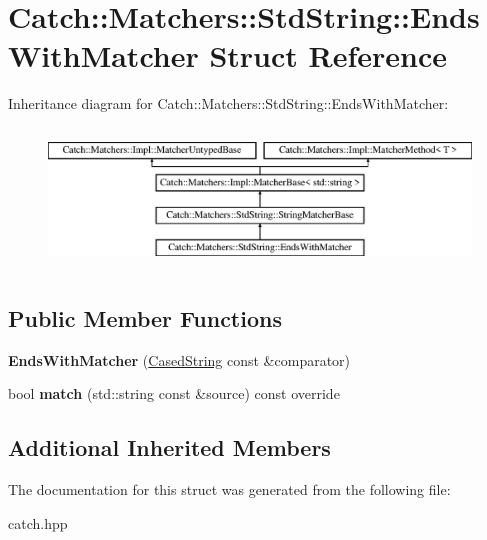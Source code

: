 \hypertarget{structCatch_1_1Matchers_1_1StdString_1_1EndsWithMatcher}{}\section{Catch\+::Matchers\+::Std\+String\+::Ends\+With\+Matcher Struct Reference}
\label{structCatch_1_1Matchers_1_1StdString_1_1EndsWithMatcher}
Inheritance diagram for Catch\+::Matchers\+::Std\+String\+::Ends\+With\+Matcher\+:\begin{figure}[H]
\begin{center}
\leavevmode
\includegraphics[height=3.758389cm]{structCatch_1_1Matchers_1_1StdString_1_1EndsWithMatcher}
\end{center}
\end{figure}
\subsection*{Public Member Functions}
\begin{DoxyCompactItemize}
\item 
\mbox{\label{structCatch_1_1Matchers_1_1StdString_1_1EndsWithMatcher_aa5ec700b4629562f74f362080accfd7b}} 
{\bfseries Ends\+With\+Matcher} (\mbox{\hyperlink{structCatch_1_1Matchers_1_1StdString_1_1CasedString}{Cased\+String}} const \&comparator)
\item 
\mbox{\label{structCatch_1_1Matchers_1_1StdString_1_1EndsWithMatcher_aca2741fa57374a2a98d2a84ac3e13a6d}} 
bool {\bfseries match} (std\+::string const \&source) const override
\end{DoxyCompactItemize}
\subsection*{Additional Inherited Members}


The documentation for this struct was generated from the following file\+:\begin{DoxyCompactItemize}
\item 
catch.\+hpp\end{DoxyCompactItemize}
